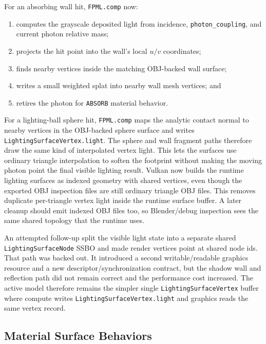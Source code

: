For an absorbing wall hit, \texttt{FPML.comp} now:
\begin{enumerate}
    \item computes the grayscale deposited light from incidence,
          \texttt{photon\_coupling}, and current photon relative mass;
    \item projects the hit point into the wall's local \(u/v\) coordinates;
    \item finds nearby vertices inside the matching OBJ-backed wall surface;
    \item writes a small weighted splat into nearby wall mesh vertices; and
    \item retires the photon for \texttt{ABSORB} material behavior.
\end{enumerate}

For a lighting-ball sphere hit, \texttt{FPML.comp} maps the analytic contact
normal to nearby vertices in the OBJ-backed sphere surface and writes
\texttt{LightingSurfaceVertex.light}.  The sphere and wall fragment paths
therefore draw the same kind of interpolated vertex light.  This lets the
surfaces use ordinary triangle interpolation to soften the footprint without
making the moving photon point the final visible lighting result.  Vulkan now
builds the runtime lighting surfaces as indexed geometry with shared vertices,
even though the exported OBJ inspection files are still ordinary triangle OBJ
files.  This removes duplicate per-triangle vertex light inside the runtime
surface buffer.  A later cleanup should emit indexed OBJ files too, so
Blender/debug inspection sees the same shared topology that the runtime uses.

An attempted follow-up split the visible light state into a separate shared
\texttt{LightingSurfaceNode} SSBO and made render vertices point at shared
node ids.  That path was backed out.  It introduced a second writable/readable
graphics resource and a new descriptor/synchronization contract, but the
shadow wall and reflection path did not remain correct and the performance
cost increased.  The active model therefore remains the simpler single
\texttt{LightingSurfaceVertex} buffer where compute writes
\texttt{LightingSurfaceVertex.light} and graphics reads the same vertex
record.

\subsection{Material Surface Behaviors}

